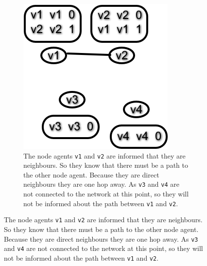 \begin{figure}
\begin{subfigure}{.45\textwidth}
        \includegraphics[width=\textwidth] {images/dv1.png}
        \caption{The node agents \texttt{v1} and \texttt{v2} are informed that they are neighbours.
                 So they know that there must be a path to the other node agent.
                 Because they are direct neighbours they are one hop away.
                 As \texttt{v3} and \texttt{v4} are not connected to the network at this point, so they will not be informed about the path between \texttt{v1} and \texttt{v2}.}
    \end{subfigure}


\end{figure}
